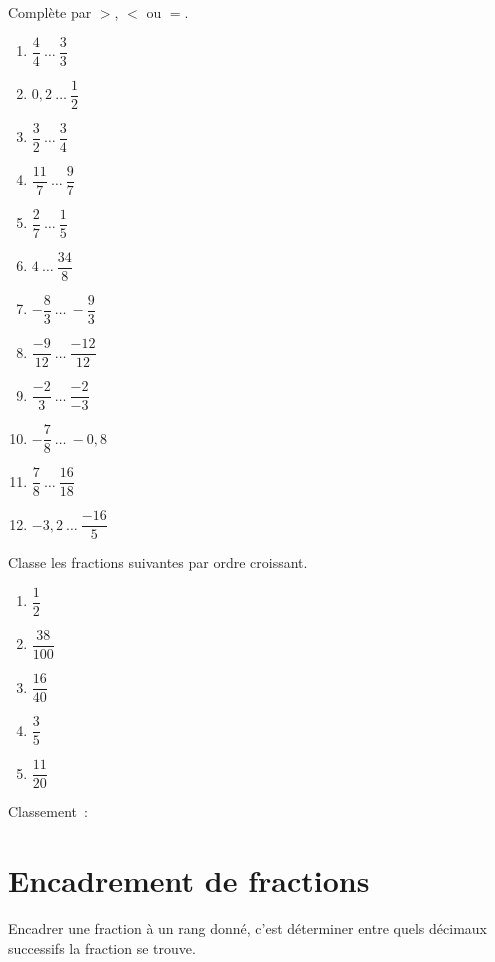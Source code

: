 \documentclass[../math2.tex]{subfiles}
\begin{document}
\begin{exercise}
  Complète par $>$, $<$ ou $=$.
  \begin{enumerate}[cols=4]
    \item $\dfrac{4}{4}~\ldots~\dfrac{3}{3}$
    \item $0,2~\ldots~\dfrac{1}{2}$
    \item $\dfrac{3}{2}~\ldots~\dfrac{3}{4}$
    \item $\dfrac{11}{7}~\ldots~\dfrac{9}{7}$
    \item $\dfrac{2}{7}~\ldots~\dfrac{1}{5}$
    \item $4~\ldots~\dfrac{34}{8}$
    \item $- \dfrac{8}{3}~\ldots~ - \dfrac{9}{3}$
    \item $\dfrac{- 9}{12}~\ldots~\dfrac{- 12}{12}$
    \item $\dfrac{- 2}{3}~\ldots~\dfrac{- 2}{- 3}$
    \item $- \dfrac{7}{8}~\ldots~ - 0,8$
    \item $\dfrac{7}{8}~\ldots~\dfrac{16}{18}$
    \item $- 3,2~\ldots~\dfrac{- 16}{5}$
  \end{enumerate}
\end{exercise}

\begin{exercise}
  Classe les fractions suivantes par ordre croissant.
  \begin{enumerate}[label=, cols=5]
    \item $\dfrac{1}{2}$
    \item $\dfrac{38}{100}$
    \item $\dfrac{16}{40}$
    \item $\dfrac{3}{5}$
    \item $\dfrac{11}{20}$
  \end{enumerate}
  Classement~:
\end{exercise}

\section{Encadrement de fractions}

Encadrer une fraction à un rang donné, c'est déterminer entre quels décimaux successifs la fraction se trouve.
\end{document}
